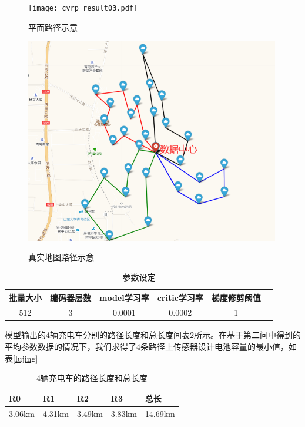 \documentclass{whutmod}
\begin{document}
\begin{figure}[H]
	\begin{minipage}[t]{0.43\textwidth}
		\centering
		\texttt{[image: cvrp\_result03.pdf]}	
		\label{fig:cvrp_result03_1}
           \caption{平面路径示意}
	\end{minipage}
	\qquad
	\begin{minipage}[t]{0.48\textwidth}
		\centering
		\includegraphics[width=0.99\textwidth]{cvrp_result03.png}
		\label{fig:cvrp_result03_2}
          \caption{真实地图路径示意}	
	\end{minipage}
\end{figure}

\begin{table}[htbp]
	\centering
	\caption{参数设定}
	\begin{tabular}{cccccc}
		\toprule
		\multicolumn{1}{l}{批量大小} & \multicolumn{1}{l}{编码器层数} & \multicolumn{1}{l}{model学习率} & \multicolumn{1}{l}{critic学习率} & \multicolumn{1}{l}{梯度修剪阈值} \\
		\midrule
		512   & 3       & 0.0001 & 0.0002 & 1 \\
		\bottomrule
	\end{tabular}%
	\label{tab:hyper_parameter}%
\end{table}%

模型输出的4辆充电车分别的路径长度和总长度间表\ref{tab:cvrp_result03}所示。在基于第二问中得到的平均参数数据的情况下，我们求得了4条路径上传感器设计电池容量的最小值，如表\ref{lujing}
\begin{table}[!htbp]
	\centering
	\caption{4辆充电车的路径长度和总长度}
	  \begin{tabular}{ccccc}
	  \toprule
	  \multicolumn{1}{l}{R0} & \multicolumn{1}{l}{R1} & \multicolumn{1}{l}{R2} & \multicolumn{1}{l}{R3} & \multicolumn{1}{l}{总长} \\
	  \midrule
	  3.06km  & 4.31km  & 3.49km  & 3.83km  & 14.69km \\
	  \bottomrule
	  \end{tabular}%
	\label{tab:cvrp_result03}%
  \end{table}%
\end{document}
